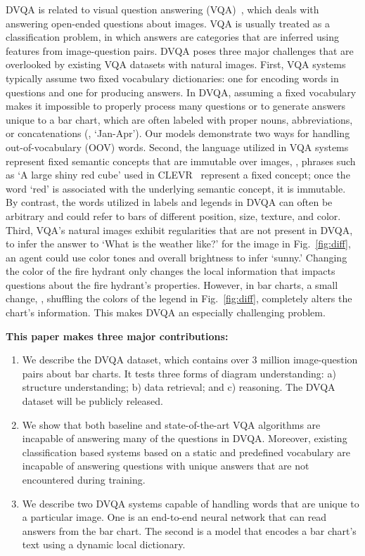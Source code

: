 \documentclass[10pt,twocolumn,letterpaper]{article}
\newcommand{\new}[1]{#1}
\begin{document}
DVQA is related to visual question answering (VQA)~\cite{malinowski2014multi,antol2015vqa}, which deals with answering open-ended questions about images. VQA is usually treated as a classification problem, in which answers are categories that are inferred using features from image-question pairs. DVQA poses three major challenges that are overlooked by  existing VQA datasets with natural images. First, VQA systems typically assume two fixed vocabulary dictionaries: one for encoding words in questions and one for producing answers. In DVQA, assuming a fixed vocabulary makes it impossible to properly process many questions or to generate answers unique to a bar chart, which are often labeled with proper nouns, abbreviations, or concatenations (\eg, `Jan-Apr'). Our models demonstrate two ways for handling out-of-vocabulary (OOV) words. \new{Second, the language utilized in VQA systems represent fixed semantic concepts that are immutable over images, \eg, phrases such as `A large shiny red cube' used in CLEVR~\cite{johnson2016clevr} represent a fixed concept; once the word `red' is associated with the underlying semantic concept, it is immutable. By contrast, the words utilized in labels and legends in DVQA can often be arbitrary and could refer to bars of different position, size, texture, and color.} Third, VQA's natural images exhibit regularities that are not present in DVQA, \eg to infer the answer to `What is the weather like?' for the image in Fig.~\ref{fig:diff}, an agent could use color tones and overall brightness to infer `sunny.' Changing the color of the fire hydrant only changes the local information that impacts questions about the fire hydrant's properties. However, in bar charts, a small change, \eg, shuffling the colors of the legend in Fig.~\ref{fig:diff}, completely alters the chart's information. This makes DVQA an especially challenging problem.

\textbf{This paper makes three major contributions:}
\begin{enumerate}
\item We describe the DVQA dataset, which contains over 3 million image-question pairs about bar charts. It tests three forms of diagram understanding:  a) structure understanding; b) data retrieval; and c) reasoning. The DVQA dataset will be publicly released.
\item We show that both baseline and state-of-the-art VQA algorithms are incapable of answering many of the questions in DVQA. Moreover, existing classification based systems based on a static and predefined vocabulary are incapable of answering questions with unique answers that are not encountered during training.
\item We describe two DVQA systems capable of handling words that are unique to a particular image. One is an end-to-end neural network that can read answers from the bar chart. The second is a model that encodes a bar chart's text using a dynamic local dictionary.
\end{enumerate}
\end{document}
